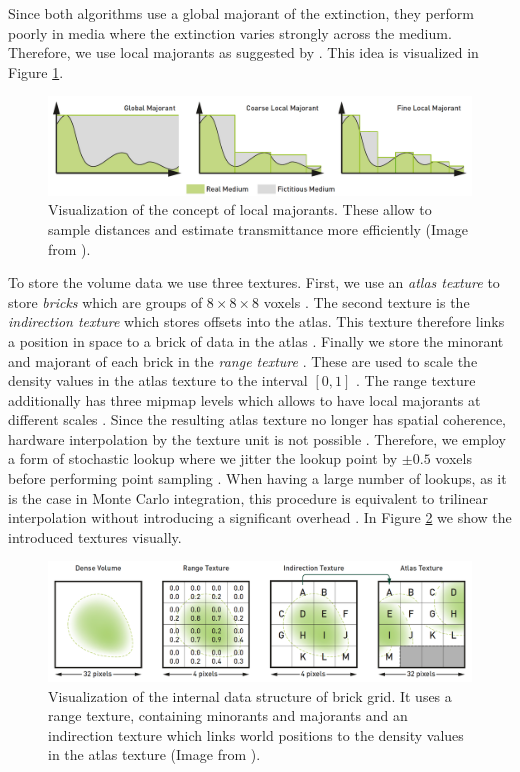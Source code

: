 Since both algorithms use a global majorant of the extinction, they perform poorly in media where the extinction varies strongly across the medium.
Therefore, we use local majorants as suggested by \citeauthor{brick_grid} \cite{brick_grid}.
This idea is visualized in Figure \ref{fig:brick_grid_majorants}.
\begin{figure}[t]
    \centering
    \includegraphics[width=0.9\linewidth]{img/brick_grid_majorants.png}
    \caption[Visualization of local density majorants]{Visualization of the concept of local majorants. These allow to sample distances and estimate transmittance more efficiently (Image from \cite{brick_grid}).}
    \label{fig:brick_grid_majorants}
\end{figure}
To store the volume data we use three textures.
First, we use an \textit{atlas texture} to store \textit{bricks} which are groups of $8 \times 8 \times 8$ voxels \cite{brick_grid}.
The second texture is the \textit{indirection texture} which stores offsets into the atlas.
This texture therefore links a position in space to a brick of data in the atlas \cite{brick_grid}.
Finally we store the minorant and majorant of each brick in the \textit{range texture} \cite{brick_grid}.
These are used to scale the density values in the atlas texture to the interval $[0, 1]$ \cite{brick_grid}.
The range texture additionally has three mipmap levels which allows to have local majorants at different scales \cite{brick_grid}.
Since the resulting atlas texture no longer has spatial coherence, hardware interpolation by the texture unit is not possible \cite{brick_grid}.
Therefore, we employ a form of stochastic lookup where we jitter the lookup point by $\pm0.5$ voxels before performing point sampling \cite{brick_grid}.
When having a large number of lookups, as it is the case in Monte Carlo integration, this procedure is equivalent to trilinear interpolation without introducing a significant overhead \cite{brick_grid}.
In Figure \ref{fig:brick_grid_datastructure} we show the introduced textures visually.
\begin{figure}[t]
    \centering
    \includegraphics[width=0.9\linewidth]{img/brick_grid_datastructure.png}
    \caption[Data structure of brick grid]{Visualization of the internal data structure of brick grid. It uses a range texture, containing minorants and majorants and an indirection texture which links world positions to the density values in the atlas texture (Image from \cite{brick_grid}).}
    \label{fig:brick_grid_datastructure}
\end{figure}

